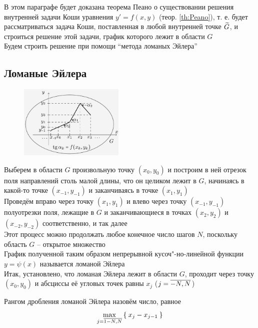 В этом параграфе будет доказана теорема Пеано о существовании решения внутренней задачи Коши уравнения  $ y' = f(x, y) $ (теор. \ref{th:Peano}), т. е. будет рассматриваться задача Коши, поставленная в любой внутренней точке $ \widetilde{G} $, и строиться решение этой задачи, график которого лежит в области $ G $ \\
Будем строить решение при помощи ``метода ломаных Эйлера''

\subsection{Ломаные Эйлера}

\begin{figure}
	\centering
    \includegraphics[width=0.445\textwidth]{euler-polylines}
\end{figure}

Выберем в области $ G $ произвольную точку $ (x_0, y_0) $ и построим в ней отрезок поля направлений столь малой длины, что он целиком лежит в $ G $, начинаясь в какой-то точке $ (x_{-1}, y_{-1}) $ и заканчиваясь в точке $ (x_1, y_1) $ \\
Проведём вправо через точку $ (x_1, y_1) $ и влево через точку $ (x_{-1}, y_{-1}) $ полуотрезки поля, лежащие в $ G $ и заканчивающиеся в точках $ (x_2, y_2) $ и $ (x_{-2}, y_{-2}) $ соответственно, и так далее \\
Этот процесс можно продолжать любое конечное число шагов $ N $, поскольку область $ G $ -- открытое множество \\
График полученной таким образом непрерывной кусоч"-но-линейной функции $ y = \psi(x) $ называется ломаной Эйлера \\
Итак, установлено, что ломаная Эйлера лежит в области $ G $, проходит через точку $ (x_0, y_0) $ и абсциссы её угловых точек равны $ x_j $ ($ j = \overline{-N, N} $)

\begin{definition}
	Рангом дробления ломаной Эйлера назовём число, равное
    $$ \max\limits_{j = \overline{1 - N, N}}\Set{x_j - x_{j - 1}} $$
\end{definition}

